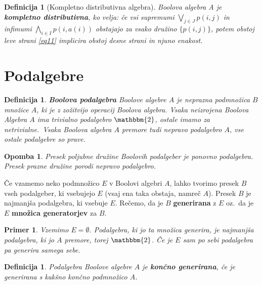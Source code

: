 \documentclass{amsart}
\newtheorem{definicija}[izrek]{Definicija}
\newtheorem{opomba}[izrek]{Opomba}
\newtheorem{primer}[izrek]{Primer}
\begin{document}
\begin{definicija}[Kompletno distributivna algebra]
    Boolova algebra A je {\bf \mbox{kompletno} distributivna}, ko velja:
    če vsi supremumi \(\bigvee_{j \in J} p(i, j)\) in infimumi \(\bigwedge_{i \in I} p(i, a(i))\) obstajajo za vsako družino
    \(\{p(i, j)\}\), potem obstoj leve strani \eqref{eq11} implicira obstoj desne strani in njuno enakost.
\end{definicija}



\section{Podalgebre}

\begin{definicija}
    \textbf{Boolova podalgebra} Boolove algebre $A$ je neprazna podmnožica $B$ množice $A$, ki je z zožitvijo operacij Boolova algebra.
    Vsaka neizrojena Boolova Algebra $A$ ima trivialno podalgebro $\mathbbm{2}$, ostale imamo za netrivialne.\
    Vsaka Boolova algebra $A$ premore tudi nepravo podalgebro $A$, vse ostale podalgebre so prave.
\end{definicija}

\begin{opomba}
    Presek poljubne družine Boolovih podalgeber je ponovno podalgebra. Presek prazne družine porodi nepravo podalgebro.
\end{opomba}

Če vzamemo neko podmnožico \(E\) v Boolovi algebri \(A\), lahko tvorimo presek $B$ vseh podalgeber, ki vsebujejo $E$ (vsaj ena taka obstaja, namreč $A$).
Presek $B$ je najmanjša podalgebra, ki vsebuje $E$. Rečemo, da je $B$ \textbf{generirana} z $E$ oz.\ da je $E$ \textbf{množica generatorjev} za $B$.

\begin{primer}
    Vzemimo \(E = \emptyset\). Podalgebra, ki jo ta množica generira, je najmanjša podalgebra, ki jo $A$ premore, torej $\mathbbm{2}$. Če je $E$ sam po sebi podalgebra pa generira samega sebe.
\end{primer}

\begin{definicija}
    Podalgebra Boolove algebre $A$ je \textbf{končno generirana}, če je generirana s kakšno končno podmnožico $A$.
\end{definicija}
\end{document}
